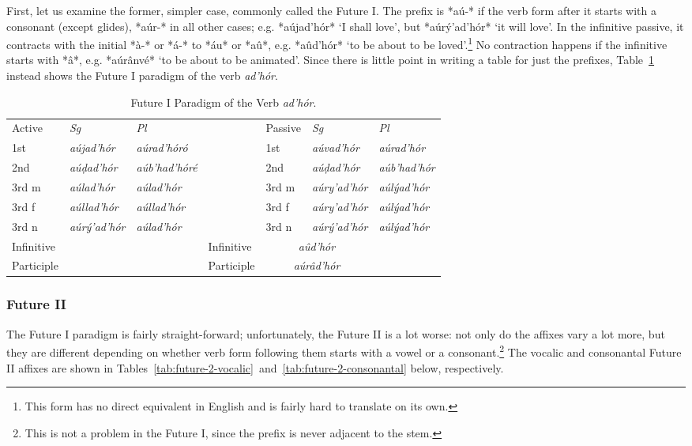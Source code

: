 \documentclass[a4paper, 12pt, oneside, final]{article}
\let \nf \normalfont
\def \d {ḍ}
\begin{document}
First, let us examine the former, simpler case, commonly called the Future I. The prefix is *aú-* if the verb form
after it starts with a consonant (except glides), *aúr-* in all other cases; e.g. *aújad’hór* ‘I shall love’, but
*aúrý’ad’hór* ‘it will love’. In the infinitive passive, it
contracts with the initial *à-* or *á-* to *áu* or *aû*, e.g. *aûd’hór* ‘to be about to be loved’.\footnote{This form
has no direct equivalent in English and is fairly hard to translate on its own.} No contraction happens
if the infinitive starts with *â*, e.g. *aúrânvé* ‘to be about to be animated’. Since
there is little point in writing a table for just the prefixes, Table~\ref{tab:adhor-paradigm-future-1} instead shows the Future I paradigm
of the verb \emph{ad’hór}.

\begin{table}[H]
\centering
\noindent\begin{tabular}{@{}|>{}l|>{\it}l|>{\it}l|>{}l|>{}l|>{\it}l|>{\it}l|}\cline{1-3}\cline{5-7}
\nf Active&\nf Sg&\nf Pl&\nf &\nf Passive&\nf Sg&\nf Pl\\\cline{1-3}\cline{5-7}
1st&aújad’hór&aúrad’hóró&&1st&aúvad’hór&aúrad’hór\\\cline{1-3}\cline{5-7}
2nd&aú\d{}ad’hór&aúb’had’hóré&&2nd&aú\d{}ad’hór&aúb’had’hór\\\cline{1-3}\cline{5-7}
3rd m&aúlad’hór&aúlad’hór&&3rd m&aúry’ad’hór&aúlýad’hór\\\cline{1-3}\cline{5-7}
3rd f&aúllad’hór&aúllad’hór&&3rd f&aúry’ad’hór &aúlýad’hór\\\cline{1-3}\cline{5-7}
3rd n&aúrý’ad’hór&aúlad’hór&&3rd n&aúrý’ad’hór&aúlýad’hór\\\cline{1-3}\cline{5-7}
Infinitive&\multicolumn{2}{c|}{\it aúdad’hór}&&Infinitive&\multicolumn{2}{c|}{\it aûd’hór}\\\cline{1-3}\cline{5-7}
Participle&\multicolumn{2}{c|}{\it aúrad’hórâ}&&Participle&\multicolumn{2}{c|}{\it aúrâd’hór}\\\cline{1-3}\cline{5-7}
\end{tabular}
\caption{Future I Paradigm of the Verb \emph{ad’hór}.}\label{tab:adhor-paradigm-future-1}
\end{table}

\subsubsection{Future II}
The Future I paradigm is fairly straight-forward; unfortunately, the Future II is a lot worse: not only do the affixes
vary a lot more, but they are different depending on whether verb form following them starts with a vowel or a consonant.\footnote{This is
not a problem in the Future I, since the prefix is never adjacent to the stem.}
The vocalic and consonantal Future II affixes are shown in Tables~\ref{tab:future-2-vocalic}~and~\ref{tab:future-2-consonantal} below, respectively.
\end{document}
